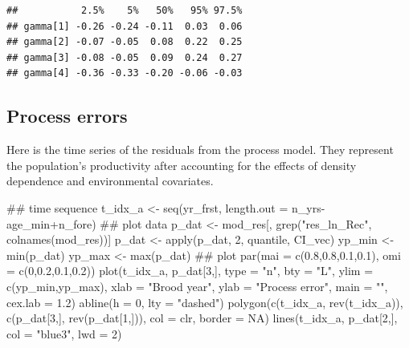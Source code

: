 \documentclass[11pt,]{article}
\newenvironment{Shaded}{}{}
\newcommand{\CommentTok}[1]{\textcolor[rgb]{0.00,0.50,0.00}{#1}}
\newcommand{\DataTypeTok}[1]{#1}
\newcommand{\DecValTok}[1]{#1}
\newcommand{\FloatTok}[1]{#1}
\newcommand{\KeywordTok}[1]{\textcolor[rgb]{0.00,0.00,1.00}{#1}}
\newcommand{\NormalTok}[1]{#1}
\newcommand{\OperatorTok}[1]{#1}
\newcommand{\OtherTok}[1]{\textcolor[rgb]{1.00,0.25,0.00}{#1}}
\newcommand{\StringTok}[1]{\textcolor[rgb]{0.00,0.50,0.50}{#1}}
\begin{document}
\begin{verbatim}
##           2.5%    5%   50%   95% 97.5%
## gamma[1] -0.26 -0.24 -0.11  0.03  0.06
## gamma[2] -0.07 -0.05  0.08  0.22  0.25
## gamma[3] -0.08 -0.05  0.09  0.24  0.27
## gamma[4] -0.36 -0.33 -0.20 -0.06 -0.03
\end{verbatim}

\hypertarget{process-errors}{%
\subsection{Process errors}\label{process-errors}}

Here is the time series of the residuals from the process model. They
represent the population's productivity after accounting for the effects
of density dependence and environmental covariates.

\begin{Shaded}
\begin{Highlighting}[]
\CommentTok{## time sequence}
\NormalTok{t_idx_a <-}\StringTok{ }\KeywordTok{seq}\NormalTok{(yr_frst, }\DataTypeTok{length.out =}\NormalTok{ n_yrs}\OperatorTok{-}\NormalTok{age_min}\OperatorTok{+}\NormalTok{n_fore)}
\CommentTok{## plot data}
\NormalTok{p_dat <-}\StringTok{ }\NormalTok{mod_res[, }\KeywordTok{grep}\NormalTok{(}\StringTok{"res_ln_Rec"}\NormalTok{, }\KeywordTok{colnames}\NormalTok{(mod_res))]}
\NormalTok{p_dat <-}\StringTok{ }\KeywordTok{apply}\NormalTok{(p_dat, }\DecValTok{2}\NormalTok{, quantile, CI_vec)}
\NormalTok{yp_min <-}\StringTok{ }\KeywordTok{min}\NormalTok{(p_dat)}
\NormalTok{yp_max <-}\StringTok{ }\KeywordTok{max}\NormalTok{(p_dat)}
\CommentTok{## plot}
\KeywordTok{par}\NormalTok{(}\DataTypeTok{mai =} \KeywordTok{c}\NormalTok{(}\FloatTok{0.8}\NormalTok{,}\FloatTok{0.8}\NormalTok{,}\FloatTok{0.1}\NormalTok{,}\FloatTok{0.1}\NormalTok{), }\DataTypeTok{omi =} \KeywordTok{c}\NormalTok{(}\DecValTok{0}\NormalTok{,}\FloatTok{0.2}\NormalTok{,}\FloatTok{0.1}\NormalTok{,}\FloatTok{0.2}\NormalTok{))}
\KeywordTok{plot}\NormalTok{(t_idx_a, p_dat[}\DecValTok{3}\NormalTok{,],}
     \DataTypeTok{type =} \StringTok{"n"}\NormalTok{,  }\DataTypeTok{bty =} \StringTok{"L"}\NormalTok{,}
     \DataTypeTok{ylim =} \KeywordTok{c}\NormalTok{(yp_min,yp_max),}
     \DataTypeTok{xlab =} \StringTok{"Brood year"}\NormalTok{, }\DataTypeTok{ylab =} \StringTok{"Process error"}\NormalTok{, }\DataTypeTok{main =} \StringTok{""}\NormalTok{,}
     \DataTypeTok{cex.lab =} \FloatTok{1.2}\NormalTok{)}
\KeywordTok{abline}\NormalTok{(}\DataTypeTok{h =} \DecValTok{0}\NormalTok{, }\DataTypeTok{lty =} \StringTok{"dashed"}\NormalTok{)}
\KeywordTok{polygon}\NormalTok{(}\KeywordTok{c}\NormalTok{(t_idx_a, }\KeywordTok{rev}\NormalTok{(t_idx_a)), }\KeywordTok{c}\NormalTok{(p_dat[}\DecValTok{3}\NormalTok{,], }\KeywordTok{rev}\NormalTok{(p_dat[}\DecValTok{1}\NormalTok{,])),}
        \DataTypeTok{col =}\NormalTok{ clr, }\DataTypeTok{border =} \OtherTok{NA}\NormalTok{)}
\KeywordTok{lines}\NormalTok{(t_idx_a, p_dat[}\DecValTok{2}\NormalTok{,], }\DataTypeTok{col =} \StringTok{"blue3"}\NormalTok{, }\DataTypeTok{lwd =} \DecValTok{2}\NormalTok{)}
\end{Highlighting}
\end{Shaded}
\end{document}
